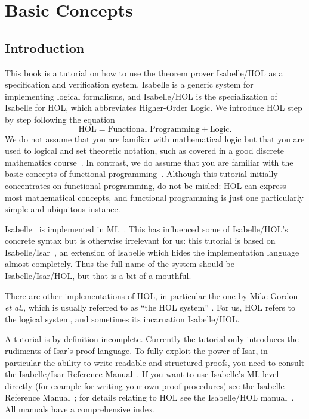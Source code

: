 \chapter{Basic Concepts}

\section{Introduction}

This book is a tutorial on how to use the theorem prover Isabelle/HOL as a
specification and verification system. Isabelle is a generic system for
implementing logical formalisms, and Isabelle/HOL is the specialization
of Isabelle for HOL, which abbreviates Higher-Order Logic. We introduce
HOL step by step following the equation
\[ \mbox{HOL} = \mbox{Functional Programming} + \mbox{Logic}. \]
We do not assume that you are familiar with mathematical logic but that
you are used to logical and set theoretic notation, such as covered
in a good discrete mathematics course~\cite{Rosen-DMA}. 
In contrast, we do assume
that you are familiar with the basic concepts of functional
programming~\cite{Bird-Haskell,Hudak-Haskell,paulson-ml2,Thompson-Haskell}.
Although this tutorial initially concentrates on functional programming, do
not be misled: HOL can express most mathematical concepts, and functional
programming is just one particularly simple and ubiquitous instance.

Isabelle~\cite{paulson-isa-book} is implemented in ML~\cite{SML}.  This has
influenced some of Isabelle/HOL's concrete syntax but is otherwise irrelevant
for us: this tutorial is based on
Isabelle/Isar~\cite{isabelle-isar-ref}, an extension of Isabelle which hides
the implementation language almost completely.  Thus the full name of the
system should be Isabelle/Isar/HOL, but that is a bit of a mouthful.

There are other implementations of HOL, in particular the one by Mike Gordon
%
\emph{et al.}, which is usually referred to as ``the HOL system''
\cite{mgordon-hol}. For us, HOL refers to the logical system, and sometimes
its incarnation Isabelle/HOL\@.

A tutorial is by definition incomplete.  Currently the tutorial only
introduces the rudiments of Isar's proof language. To fully exploit the power
of Isar, in particular the ability to write readable and structured proofs,
you need to consult the Isabelle/Isar Reference
Manual~\cite{isabelle-isar-ref}. If you want to use Isabelle's ML level
directly (for example for writing your own proof procedures) see the Isabelle
Reference Manual~\cite{isabelle-ref}; for details relating to HOL see the
Isabelle/HOL manual~\cite{isabelle-HOL}. All manuals have a comprehensive
index.

